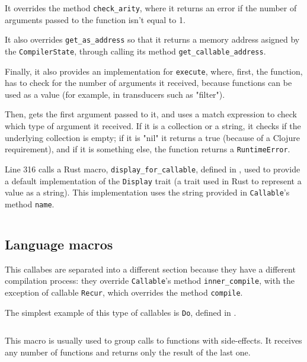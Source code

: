\documentclass[11pt]{scrreprt}
\begin{document}
It overrides the method \texttt{check\_arity}, where it returns an error if the number of arguments passed to the function isn't equal to 1.

It also overrides \texttt{get\_as\_address} so that it returns a memory address asigned by the \texttt{CompilerState}, through calling its method \texttt{get\_callable\_address}.

Finally, it also provides an implementation for \texttt{execute}, where, first, the function, has to check for the number of arguments it received, because functions can be used as a value (for example, in transducers such as "filter").
  
Then, gets the first argument passed to it, and uses a match expression to check which type of argument it received. If it is a collection or a string, it checks if the underlying collection is empty; if it is "nil" it returns a true (because of a Clojure requirement), and if it is something else, the function returns a \texttt{RuntimeError}.

Line 316 calls a Rust macro, \texttt{display\_for\_callable}, defined in , used to provide a default implementation of the \texttt{Display} trait (a trait used in Rust to represent a value as a string). This implementation uses the string provided in \texttt{Callable}'s method \texttt{name}.

\inputminted[lastline=9]{rust}{/home/mario/git/MarioJim/miniclj/miniclj-lib/src/callables/mod.rs}

\subsection{Language macros}
This callabes are separated into a different section because they have a different compilation process: they override \texttt{Callable}'s method \texttt{inner\_compile}, with the exception of callable \texttt{Recur}, which overrides the method \texttt{compile}.

The simplest example of this type of callables is \texttt{Do}, defined in .

\inputminted[firstline=6,lastline=40,breaklines=true]{rust}{/home/mario/git/MarioJim/miniclj/miniclj-lib/src/callables/groupingfns.rs}

This macro is usually used to group calls to functions with side-effects. It receives any number of functions and returns only the result of the last one.
\end{document}
